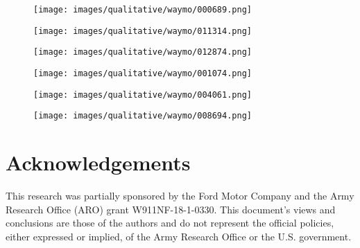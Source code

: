 \documentclass[runningheads]{llncs}
\newcommand{\waymoFigureScaleFraction}{0.7}
\newcommand{\waymo}{Waymo}
\newcommand{\gupNet}{GUP Net}
\newcommand{\methodName}{DEVIANT}
\begin{document}
        \begin{figure*}[!tb]
            \centering
\begin{subfigure}{\waymoFigureScaleFraction\linewidth}
                \texttt{[image: images/qualitative/waymo/000689.png]}
            \end{subfigure}
            \begin{subfigure}{\waymoFigureScaleFraction\linewidth}
                \texttt{[image: images/qualitative/waymo/011314.png]}
            \end{subfigure}
            \begin{subfigure}{\waymoFigureScaleFraction\linewidth}
                \texttt{[image: images/qualitative/waymo/012874.png]}
            \end{subfigure}
            \begin{subfigure}{\waymoFigureScaleFraction\linewidth}
                \texttt{[image: images/qualitative/waymo/001074.png]}
            \end{subfigure}
            \begin{subfigure}{\waymoFigureScaleFraction\linewidth}
                \texttt{[image: images/qualitative/waymo/004061.png]}
            \end{subfigure}
            \begin{subfigure}{\waymoFigureScaleFraction\linewidth}
                \texttt{[image: images/qualitative/waymo/008694.png]}
            \end{subfigure}
            \caption{
            \textbf{\waymo{} Qualitative Results}. 
            \methodName{} predictions in general are more accurate than \textcolor{set1_cyan}{\gupNet} \cite{lu2021geometry}.
            [Key: \textcolor{my_magenta}{Cars}, \textcolor{orange}{Cyclists} and \textcolor{violet}{Pedestrians} of \methodName; \textcolor{set1_cyan}{all classes of \gupNet}, and \textcolor{my_green}{Ground Truth} in BEV].}
            \label{fig:qualitative_waymo}
        \end{figure*}



\section*{Acknowledgements}
    This research was partially sponsored by the Ford Motor Company and the Army Research Office (ARO) grant W911NF-18-1-0330. 
    This document's views and conclusions are those of the authors and do not represent the official policies, either expressed or implied, of the Army Research Office or the U.S. government.
\end{document}
